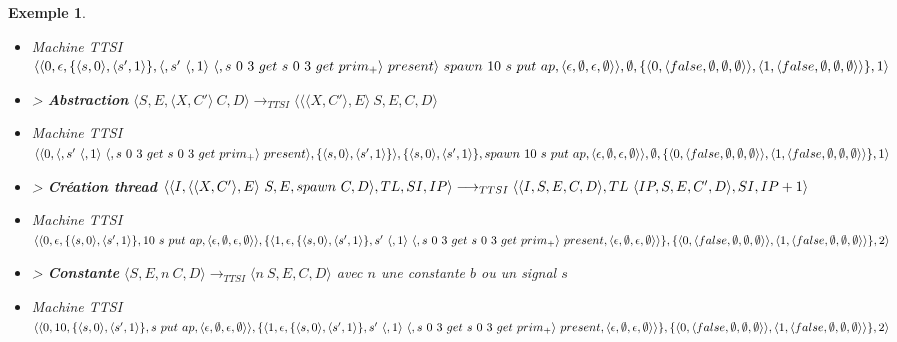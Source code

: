 \documentclass[10pt,a4paper]{report}
\newtheorem{ex}{Exemple}
\begin{document}
\begin{ex}
\begin{itemize}
			\item[] Machine TTSI $\langle\langle 0, \epsilon ,\{\langle s,0\rangle,\langle s',1\rangle\},\langle, s'~\langle,1\rangle~\langle,s~0~3~get~s~0~3~get~prim_{+}\rangle~present\rangle~spawn~10~s~put~ap,\langle\epsilon,\emptyset,\epsilon,\emptyset\rangle\rangle\\,\emptyset,\{\langle 0,\langle false,\emptyset,\emptyset,\emptyset\rangle\rangle,\langle 1,\langle false,\emptyset,\emptyset,\emptyset\rangle\rangle\},1\rangle$
			\item[] > \textbf{Abstraction} $\langle S,E,\langle X,C'\rangle~C,D\rangle
			\longrightarrow_{TTSI} 
			\langle \langle\langle X,C'\rangle,E\rangle~S,E,C,D\rangle$
			\item[] Machine TTSI $\langle\langle 0, \langle, s'~\langle,1\rangle~\langle,s~0~3~get~s~0~3~get~prim_{+}\rangle~present\rangle,\{\langle s,0\rangle,\langle s',1\rangle\}\rangle ,\{\langle s,0\rangle,\langle s',1\rangle\},spawn~10~s~put~ap,\\\langle\epsilon,\emptyset,\epsilon,\emptyset\rangle\rangle,\emptyset,\{\langle 0,\langle false,\emptyset,\emptyset,\emptyset\rangle\rangle,\langle 1,\langle false,\emptyset,\emptyset,\emptyset\rangle\rangle\},1\rangle$
			\item[] > \textbf{Création thread} $\langle\langle I,\langle\langle X,C'\rangle, E\rangle~S,E,spawn~C,D\rangle,TL,SI,IP\rangle 
			\longrightarrow_{TTSI} 
			\\\langle\langle I,S,E,C,D\rangle,TL~\langle IP,S,E,C',D\rangle,SI,IP+1\rangle$
			\item[] Machine TTSI $\langle\langle 0,\epsilon,\{\langle s,0\rangle,\langle s',1\rangle\},10~s~put~ap,\langle\epsilon,\emptyset,\epsilon,\emptyset\rangle\rangle,\{\langle 1,\epsilon,\{\langle s,0\rangle,\langle s',1\rangle\}, s'~\langle,1\rangle~\langle,s~0~3~get~s~0~3~get~prim_{+}\rangle~present ,\\\langle\epsilon,\emptyset,\epsilon,\emptyset\rangle\rangle\},\{\langle 0,\langle false,\emptyset,\emptyset,\emptyset\rangle\rangle,\langle 1,\langle false,\emptyset,\emptyset,\emptyset\rangle\rangle\},2\rangle$
			\item[] > \textbf{Constante} $\langle S,E,n~C,D\rangle 
			\longrightarrow_{TTSI} 
			\langle n~S,E,C,D\rangle$ avec $n$ une constante $b$ ou un signal $s$
			\item[] Machine TTSI $\langle\langle 0,10,\{\langle s,0\rangle,\langle s',1\rangle\},s~put~ap,\langle\epsilon,\emptyset,\epsilon,\emptyset\rangle\rangle,\{\langle 1,\epsilon,\{\langle s,0\rangle,\langle s',1\rangle\}, s'~\langle,1\rangle~\langle,s~0~3~get~s~0~3~get~prim_{+}\rangle~present ,\\\langle\epsilon,\emptyset,\epsilon,\emptyset\rangle\rangle\},\{\langle 0,\langle false,\emptyset,\emptyset,\emptyset\rangle\rangle,\langle 1,\langle false,\emptyset,\emptyset,\emptyset\rangle\rangle\},2\rangle$

\end{itemize}
\end{ex}
\end{document}
